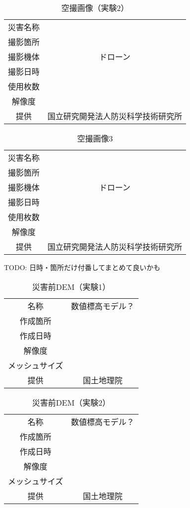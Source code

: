     \begin{table}[b]
      \centering
      \caption{空撮画像（実験2）}
      \label{空撮画像2}
      \begin{tabular}{cc}
        \hline
        災害名称 &  \\
        撮影箇所 &  \\
        撮影機体 & ドローン \\
        撮影日時 &  \\
        使用枚数 & \\
        解像度 &  \\
        提供 & 国立研究開発法人防災科学技術研究所 \\ \hline
      \end{tabular}
    \end{table}

    \begin{table}[b]
      \centering
      \caption{空撮画像3}
      \label{空撮画像3}
      \begin{tabular}{cc}
        \hline
        災害名称 &  \\
        撮影箇所 &  \\
        撮影機体 & ドローン \\
        撮影日時 &  \\
        使用枚数 & \\
        解像度 &  \\
        提供 & 国立研究開発法人防災科学技術研究所 \\ \hline
      \end{tabular}
    \end{table}

    TODO: 日時・箇所だけ付番してまとめて良いかも
    \begin{table}[b]
      \centering
      \caption{災害前DEM（実験1）}
      \label{災害前DEM1}
      \begin{tabular}{cc}
        \hline
        名称 & 数値標高モデル？ \\
        作成箇所 &  \\
        作成日時 &  \\
        解像度 & \\
        メッシュサイズ &  \\
        提供 & 国土地理院 \\ \hline
      \end{tabular}
    \end{table}

    \begin{table}[b]
      \centering
      \caption{災害前DEM（実験2）}
      \label{災害前DEM2}
      \begin{tabular}{cc}
        \hline
        名称 & 数値標高モデル？ \\
        作成箇所 &  \\
        作成日時 &  \\
        解像度 & \\
        メッシュサイズ &  \\
        提供 & 国土地理院 \\ \hline
      \end{tabular}
    \end{table}

